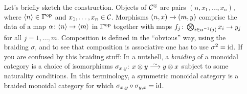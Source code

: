 Let's briefly sketch the construction. Objects of $\mathcal{C}^\otimes$ are pairs $(n,x_1,\dotsc,x_n)$, where $\langle n\rangle \in \IGamma^\op$ and $x_1,\dotsc,x_n\in \mathcal{C}$. Morphisms $(n,x)\morphism (m,y)$ comprise the data of a map $\alpha\colon \langle n\rangle \morphism\langle m\rangle $ in $\IGamma^\op$ together with maps $f_j\colon \bigotimes_{i\in\alpha^{-1}(j)}x_i\morphism y_j$ for all $j=1,\dotsc,m$. Composition is defined in the \enquote{obvious} way, using the braiding $\sigma$, and to see that composition is associative one has to use $\sigma^2=\operatorname{id}$. If you are confused by this braiding stuff: In a nutshell, a \emph{braiding} of a monoidal category is a choice of isomorphisms $\sigma_{x,y}\colon x\otimes y\isomorphism y\otimes x$ subject to some naturality conditions. In this terminology, a symmetric monoidal category is a braided monoidal category for which $\sigma_{x,y}\circ \sigma_{y,x}=\operatorname{id}$.

